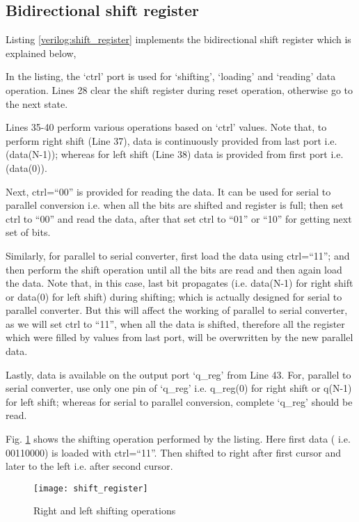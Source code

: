 \subsection{Bidirectional shift register}
Listing \ref{verilog:shift_register} implements the bidirectional shift register which is explained below, 

\begin{explanation}
	In the listing, the `ctrl' port is used for `shifting', `loading' and `reading' data operation. Lines 28 clear the shift register during reset operation, otherwise go to the next state. 
	
	Lines 35-40 perform various operations based on `ctrl' values. Note that, to perform right shift (Line 37), data is continuously provided from last port i.e. (data(N-1)); whereas for left shift (Line 38) data is provided from first port i.e. (data(0)). 
	
	Next, ctrl=``00'' is provided for reading the data. It can be used for serial to parallel conversion i.e. when all the bits are shifted and register is full; then set ctrl to ``00'' and read the data, after that set ctrl to ``01'' or ``10'' for getting next set of bits. 
	
	Similarly, for parallel to serial converter, first load the data using ctrl=``11''; and then perform the shift operation until all the bits are read and then again load the data. Note that, in this case, last bit propagates (i.e. data(N-1) for right shift or data(0) for left shift) during shifting; which is actually designed for serial to parallel converter. But this will affect the working of parallel to serial converter, as we will set ctrl to ``11'', when all the data is shifted, therefore all the register which were filled by values from last port, will be overwritten by the new parallel data. 
	
	Lastly, data is available on the output port `q\_reg' from Line 43. For, parallel to serial converter, use only one pin of `q\_reg' i.e. q\_reg(0) for right shift or q(N-1) for left shift; whereas for serial to parallel conversion, complete  `q\_reg' should be read.
	
	Fig. \ref{fig:shift_register} shows the shifting operation performed by the listing. Here first data ( i.e. 00110000) is loaded with ctrl=``11''. Then shifted to right after first cursor and later to the left i.e. after second cursor.
	
	\begin{figure}[!h]
		\centering
		\texttt{[image: shift\_register]}
		\caption{Right and left shifting operations}
		\label{fig:shift_register}
	\end{figure}	 
\end{explanation}

